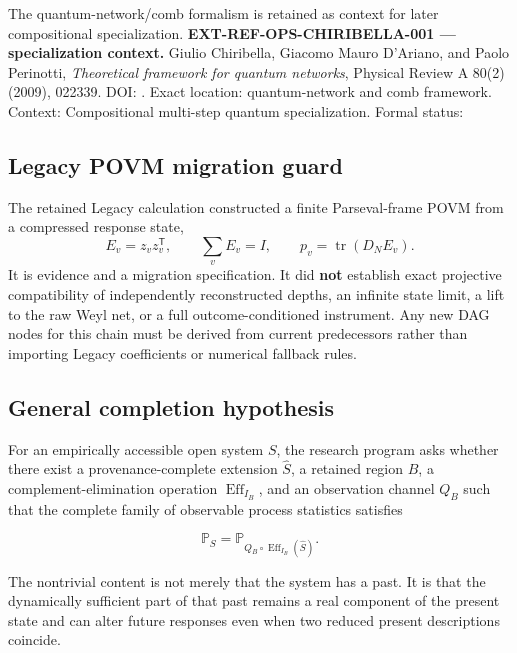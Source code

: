 The quantum-network/comb formalism is retained as context for later
compositional specialization. \textbf{EXT-REF-OPS-CHIRIBELLA-001 ---
specialization context.} Giulio Chiribella, Giacomo Mauro D'Ariano, and
Paolo Perinotti, \emph{Theoretical framework for quantum networks},
Physical Review A 80(2) (2009), 022339. DOI:
\texttt{\protect{}}. Exact location: quantum-network and
comb framework. Context: Compositional multi-step quantum
specialization. Formal status:
\texttt{\protect{}}

\subsection{Legacy POVM migration
guard}\label{legacy-povm-migration-guard}

The retained Legacy calculation constructed a finite Parseval-frame POVM
from a compressed response state, \[
E_v=z_vz_v^{\mathsf T},\qquad \sum_vE_v=I,\qquad p_v=\operatorname{tr}(D_NE_v).
\] It is evidence and a migration specification. It did \textbf{not}
establish exact projective compatibility of independently reconstructed
depths, an infinite state limit, a lift to the raw Weyl net, or a full
outcome-conditioned instrument. Any new DAG nodes for this chain must be
derived from current predecessors rather than importing Legacy
coefficients or numerical fallback rules.

\subsection{General completion
hypothesis}\label{general-completion-hypothesis}

For an empirically accessible open system \(S\), the research program
asks whether there exist a provenance-complete extension \(\widehat S\),
a retained region \(B\), a complement-elimination operation
\(\operatorname{Eff}_{I_B}\), and an observation channel \(Q_B\) such
that the complete family of observable process statistics satisfies

\[
\mathbb P_S
=
\mathbb P_{Q_B\circ\operatorname{Eff}_{I_B}(\widehat S)}.
\]

The nontrivial content is not merely that the system has a past. It is
that the dynamically sufficient part of that past remains a real
component of the present state and can alter future responses even when
two reduced present descriptions coincide.

